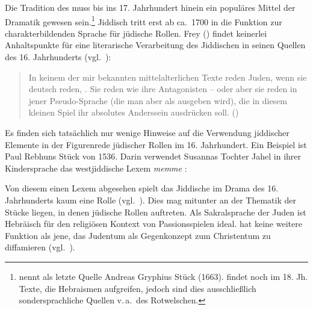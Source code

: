 Die Tradition des \hai{{\LiHe}} muss bis ins 17. Jahrhundert hinein ein populäres Mittel der Dramatik gewesen sein.\footnote{\cite[10]{Carrington1897} nennt als letzte Quelle Andreas Gryphius Stück  (1663). \cite[215]{Althaus1981} findet noch im 18. Jh. Texte, die Hebraismen aufgreifen, jedoch sind dies ausschließlich sondersprachliche Quellen v.\,a.\, des Rotwelschen.} Jiddisch tritt erst ab ca.\, 1700 in die Funktion zur charakterbildenden Sprache für jüdische Rollen. Frey (\citeyear[61]{Frey1992}) findet keinerlei Anhaltspunkte für eine literarische Verarbeitung des Jiddischen in seinen Quellen des 16. Jahrhunderts (vgl.\, \citealt[24]{Frenzel1942}):

\begin{quote}
In keinem der mir bekannten mittelalterlichen Texte reden Juden, wenn sie deutsch reden, . Sie reden wie ihre Antagonisten – oder aber sie reden in jener Pseudo-Sprache (die man aber als  ausgeben wird), die in diesem kleinen Spiel ihr absolutes Anderssein ausdrücken soll. (\citealt[61]{Frey1992})
\end{quote} 

Es finden sich tatsächlich nur wenige Hinweise auf die Verwendung jiddischer Elemente in der Figurenrede jüdischer Rollen im 16. Jahrhundert. Ein Beispiel ist Paul Rebhuns Stück  von 1536. Darin verwendet Susannas Tochter Jahel in ihrer Kindersprache das westjiddische Lexem \textit{memme} :


\noindent Von diesem einen Lexem abgesehen spielt das Jiddische im Drama des 16. Jahrhunderts kaum eine Rolle (vgl.\, \citealt[28]{Lowack1905}). Dies mag mitunter an der Thematik der Stücke liegen, in denen jüdische Rollen auftreten. Als Sakralsprache der Juden ist Hebräisch für den religiösen Kontext von Passionsspielen ideal. \hai{{\LiHe}} hat keine weitere Funktion als jene, das Judentum als Gegenkonzept zum Christentum zu diffamieren (vgl.\, \citealt{Frey1992,Frey1994}). 

